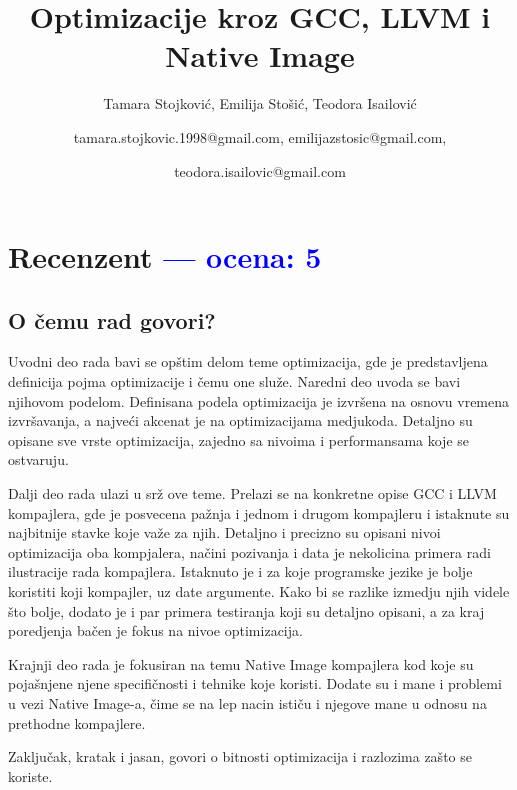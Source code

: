 \documentclass[a4paper]{report}
\newcommand{\odgovor}[1]{\textcolor{blue}{#1}}
\begin{document}
\title{Optimizacije kroz GCC, LLVM i Native Image}
\author{Tamara Stojković, Emilija Stošić, Teodora Isailović \and tamara.stojkovic.1998@gmail.com, emilijazstosic@gmail.com, \and teodora.isailovic@gmail.com}


\maketitle

\tableofcontents


\chapter{Recenzent \odgovor{--- ocena: 5} }


\section{O čemu rad govori?}

Uvodni deo rada bavi se opštim delom teme optimizacija, gde je predstavljena definicija pojma optimizacije i čemu one služe. Naredni deo uvoda se bavi njihovom podelom. Definisana podela optimizacija je izvršena na osnovu vremena izvršavanja, a najveći akcenat je na optimizacijama medjukoda. Detaljno su opisane sve vrste optimizacija, zajedno sa nivoima i performansama koje se ostvaruju.

Dalji deo rada ulazi u srž ove teme. Prelazi se na konkretne opise GCC i LLVM kompajlera, gde je posvecena pažnja i jednom i drugom kompajleru i istaknute su najbitnije stavke koje važe za njih. Detaljno i precizno su opisani nivoi optimizacija oba kompjalera, načini pozivanja i data je nekolicina primera radi ilustracije rada kompajlera. Istaknuto je i za koje programske jezike je bolje koristiti koji kompajler, uz date argumente. Kako bi se razlike izmedju njih videle što bolje, dodato je i par primera testiranja koji su detaljno opisani, a za kraj poredjenja bačen je fokus na nivoe optimizacija. 

Krajnji deo rada je fokusiran na temu Native Image kompajlera kod koje su pojašnjene njene specifičnosti i tehnike koje koristi. Dodate su i mane i problemi u vezi Native Image-a, čime se na lep nacin ističu i njegove mane u odnosu na prethodne kompajlere.

Zaključak, kratak i jasan, govori o bitnosti optimizacija i razlozima zašto se koriste. 
\end{document}
